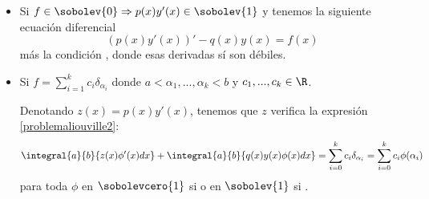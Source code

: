 \begin{itemize}
\item Si $f\in\sobolev{0} \Rightarrow p(x)y'(x)\in\sobolev{1}$ y tenemos la siguiente ecuación diferencial
\[
(p(x)y'(x))'-q(x)y(x)=f(x)
\]
más la condición , donde esas derivadas sí son débiles.
\item Si $f=\displaystyle\sum_{i=1}^kc_i\delta_{\alpha_i}$ donde $a<\alpha_1,...,\alpha_k<b$ y $c_1,...,c_k\in\R$.

Denotando $z(x)=p(x)y'(x)$, tenemos que $z$ verifica la expresión \eqref{problemaliouville2}:
\begin{equation}
\label{intentandoentenderesto}
\integral{a}{b}{z(x)\phi'(x)dx}+\integral{a}{b}{q(x)y(x)\phi(x)dx}=\sum_{i=0}^kc_i\delta_{\alpha_i}=\sum_{i=0}^kc_i\phi(\alpha_i)
\end{equation}
para toda $\phi$ en $\sobolevcero{1}$ si  o en $\sobolev{1}$ si .


\end{itemize}

